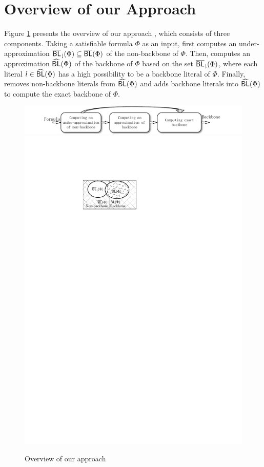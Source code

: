 \section{Overview of our Approach}\label{sec:overview}
Figure \ref{flow} presents the overview of our approach \tool, which consists of three components. Taking a satisfiable formula
$\Phi$ as an input, \tool first computes an under-approximation ${\sf \overline{BL}_\downharpoonright}(\Phi)\subseteq \overline{\textsf{BL}}(\Phi)$ of the non-backbone of
$\Phi$. Then, \tool computes an approximation ${\sf \widehat{BL}}(\Phi)$ of the backbone of $\Phi$ based on the set ${\sf \overline{BL}_\downharpoonright}(\Phi)$, where each literal $l\in {\sf \widehat{BL}}(\Phi)$ has a high possibility to be a backbone literal of $\Phi$.
Finally, \tool removes non-backbone literals from ${\sf \widehat{BL}}(\Phi)$ and adds backbone literals into ${\sf \widehat{BL}}(\Phi)$ to compute the exact backbone of $\Phi$.
\begin{figure}[t]
   \includegraphics[scale=0.75]{Framework}
  \hspace*{30mm} \includegraphics[scale=0.75]{Fig-backbone}
   \caption{Overview of our approach}
   \label{flow}
\end{figure}

